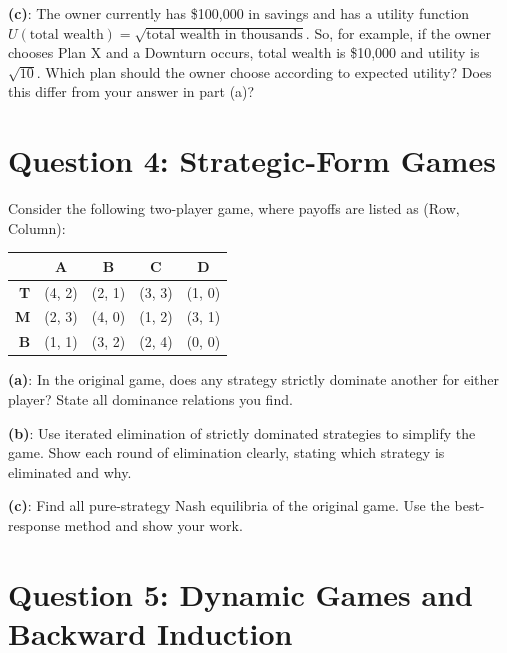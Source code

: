 \documentclass[
  english,
  11pt,
]{article}
\newcounter{none} %
\begin{document}
\vspace{4cm}

\textbf{(c)}: The owner currently has \$100,000 in savings and has a
utility function
\(U(\text{total wealth}) = \sqrt{\text{total wealth in thousands}}\).
So, for example, if the owner chooses Plan X and a Downturn occurs,
total wealth is \$10,000 and utility is \(\sqrt{10}\). Which plan should
the owner choose according to expected utility? Does this differ from
your answer in part (a)?

\newpage

\section{Question 4: Strategic-Form
Games}\label{question-4-strategic-form-games}

Consider the following two-player game, where payoffs are listed as
(Row, Column):

{\def\LTcaptype{none} %
\begin{longtable}[]{@{}rcccc@{}}
\toprule\noalign{}
& A & B & C & D \\
\midrule\noalign{}
\endhead
\bottomrule\noalign{}
\endlastfoot
\textbf{T} & (4, 2) & (2, 1) & (3, 3) & (1, 0) \\
\textbf{M} & (2, 3) & (4, 0) & (1, 2) & (3, 1) \\
\textbf{B} & (1, 1) & (3, 2) & (2, 4) & (0, 0) \\
\end{longtable}
}

\textbf{(a)}: In the original game, does any strategy strictly dominate
another for either player? State all dominance relations you find.

\vspace{4cm}

\textbf{(b)}: Use iterated elimination of strictly dominated strategies
to simplify the game. Show each round of elimination clearly, stating
which strategy is eliminated and why.

\vspace{6cm}

\textbf{(c)}: Find all pure-strategy Nash equilibria of the original
game. Use the best-response method and show your work.

\newpage

\section{Question 5: Dynamic Games and Backward
Induction}\label{question-5-dynamic-games-and-backward-induction}
\end{document}
